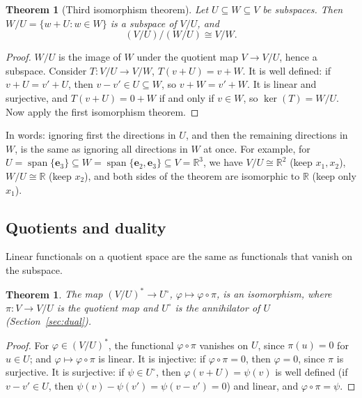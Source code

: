 \documentclass[11pt]{article}
\theoremstyle{definition}
\theoremstyle{plain}
\newtheorem{theorem}[definition]{Theorem}
\theoremstyle{remark}
\DeclareMathOperator{\Span}{span}
\begin{document}
\begin{theorem}[Third isomorphism theorem]\label{thm:third-iso}
    Let $U \subseteq W \subseteq V$ be subspaces. Then $W/U = \{w + U : w \in W\}$ is a subspace of $V/U$, and
    \[(V/U)/(W/U) \cong V/W.\]
\end{theorem}

\begin{proof}
    $W/U$ is the image of $W$ under the quotient map $V \to V/U$, hence a subspace. Consider $T: V/U \to V/W$, $T(v + U) = v + W$. It is well defined: if $v + U = v' + U$, then $v - v' \in U \subseteq W$, so $v + W = v' + W$. It is linear and surjective, and $T(v + U) = 0 + W$ if and only if $v \in W$, so $\ker(T) = W/U$. Now apply the first isomorphism theorem.
\end{proof}

In words: ignoring first the directions in $U$, and then the remaining directions in $W$, is the same as ignoring all directions in $W$ at once. For example, for $U = \Span\{\mathbf{e}_3\} \subseteq W = \Span\{\mathbf{e}_2, \mathbf{e}_3\} \subseteq V = \mathbb{R}^3$, we have $V/U \cong \mathbb{R}^2$ (keep $x_1, x_2$), $W/U \cong \mathbb{R}$ (keep $x_2$), and both sides of the theorem are isomorphic to $\mathbb{R}$ (keep only $x_1$).

\subsection{Quotients and duality}

Linear functionals on a quotient space are the same as functionals that vanish on the subspace.

\begin{theorem}\label{thm:quotient-dual}
    The map $(V/U)^* \to U^\circ$, $\varphi \mapsto \varphi \circ \pi$, is an isomorphism, where $\pi: V \to V/U$ is the quotient map and $U^\circ$ is the annihilator of $U$ (Section~\ref{sec:dual}).
\end{theorem}

\begin{proof}
    For $\varphi \in (V/U)^*$, the functional $\varphi \circ \pi$ vanishes on $U$, since $\pi(u) = 0$ for $u \in U$; and $\varphi \mapsto \varphi \circ \pi$ is linear. It is injective: if $\varphi \circ \pi = 0$, then $\varphi = 0$, since $\pi$ is surjective. It is surjective: if $\psi \in U^\circ$, then $\varphi(v + U) = \psi(v)$ is well defined (if $v - v' \in U$, then $\psi(v) - \psi(v') = \psi(v - v') = 0$) and linear, and $\varphi \circ \pi = \psi$.
\end{proof}
\end{document}
